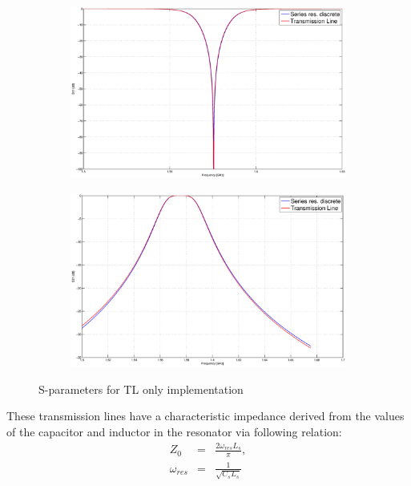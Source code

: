 \documentclass[a4paper]{article}        %
\begin{document}
  \begin{figure}[H]
  \centering
  	\begin{subfigure}{0.7\textwidth}
  	\includegraphics[width=\textwidth]{fig/Filter/2nd_order/plots/S11_TL.eps}
  	\end{subfigure}
  	\begin{subfigure}{0.7\textwidth}
  	\includegraphics[width=\textwidth]{fig/Filter/2nd_order/plots/S21_TL.eps}
  	\end{subfigure}
  	\caption{S-parameters for TL only implementation}
  	\label{fig:filter_spar_TL}
  \end{figure}

  These transmission lines have a characteristic impedance derived from the values of the capacitor and inductor in the resonator via following relation: 
  \begin{eqnarray*}
    Z_0 &=& \frac{2 \omega_{res} L_s}{\pi},\\
    \omega_{res} &=& \frac{1}{\sqrt{C_s L_s}}
  \end{eqnarray*}
\end{document}
